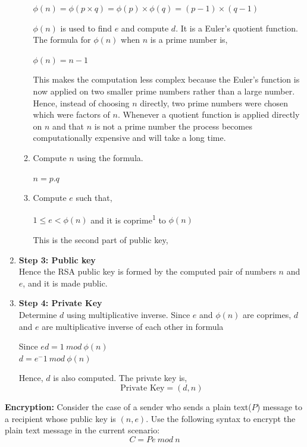 \documentclass[a4paper]{report} %
\begin{document}
\begin{enumerate}
\begin{enumerate}
\begin{center}
        $\phi(n)=\phi(p\times q)=\phi(p)\times \phi(q)=(p-1)\times (q-1)$
        \end{center}
        $\phi(n)$ is used to find $e$ and compute $d$. It is a Euler's quotient function. The formula for $\phi(n)$ when $n$ is a prime number is, \\
        \begin{center}
            $\phi(n)=n-1$
        \end{center}
        This makes the computation less complex because the Euler's function is now applied on two smaller prime numbers rather than a large number. Hence, instead of choosing $n$ directly, two prime numbers were chosen which were factors of $n$. Whenever a quotient function is applied directly on $n$ and that $n$ is not a prime number the process becomes computationally expensive and will take a long time.
        \item Compute $n$ using the formula.\\
        \begin{center}
            $n=p.q$
        \end{center}
        \item Compute $e$ such that, \\
        \begin{center}
        $1\leq e< \phi(n)$ and it is coprime\textsuperscript{1} to $\phi(n)$
        \end{center}
    This is the second part of public key,
    \end{enumerate}
    \item \textbf{Step 3: Public key}\\
     Hence the RSA public key is formed by the computed pair of numbers $n$ and $e$, and it is made public.
    \item \textbf{Step 4: Private Key}\\
    Determine $d$ using multiplicative inverse. Since $e$ and $\phi(n)$ are coprimes, $d$ and $e$ are multiplicative inverse of each other in formula
    \begin{center}
        Since $ed=1 \ mod \ \phi(n) $\\
        $d=e^-1 \ mod \ \phi(n)$
    \end{center}
    Hence, $d$ is also computed. The private key is, \\
    \begin{equation*}
        \text{Private Key}= (d,n)
    \end{equation*}
\end{enumerate}
\textbf{Encryption:}
Consider the case of a sender who sends a plain text($P$) message to a recipient whose public key is $(n,e)$. Use the following syntax to encrypt the plain text message in the current scenario:  
\begin{equation*}
    C = Pe \ mod \ n
\end{equation*}
\end{document}

